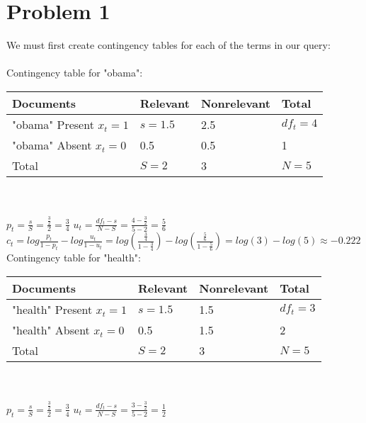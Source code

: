 \documentclass{article}%
\begin{document}
\section*{Problem 1}
We must first create contingency tables for each of the terms in our query:\\
\\
Contingency table for "obama": \\
\begin{tabular}{| l | l | l | l |}
    \hline
    Documents                   &  Relevant     & Nonrelevant   & Total         \\ \hline
    "obama" Present $x_t = 1$   &  $s = 1.5$    & 2.5           & $df_t = 4$    \\ \hline
    "obama" Absent $x_t = 0$    &  0.5          & 0.5           & 1           \\ \hline
    Total                       &  $S = 2$    & 3               & $N = 5$       \\ \hline
\end{tabular}\\
\\
$p_t = \frac{s}{S} = \frac{\frac{3}{2}}{2} = \frac{3}{4}$ \hfill
$u_t = \frac{df_t - s}{N - S} = \frac{4 - \frac{3}{2}}{5 - 2} = \frac{5}{6}$
\vspace{2mm}\\
$c_t = log \frac{p_t}{1- p_t} - log \frac{u_t}{1 - u_t}
= log \left(\frac{\frac{3}{4}}{1 - \frac{3}{4}}\right) - log \left(\frac{\frac{5}{6}}{1 - \frac{5}{6}}\right)
= log(3) - log(5) \approx -0.222$
\vspace{5mm}\\
Contingency table for "health": \\
\begin{tabular}{| l | l | l | l |}
    \hline
    Documents                   &  Relevant     & Nonrelevant   & Total         \\ \hline
    "health" Present $x_t = 1$  &  $s = 1.5$    & 1.5           & $df_t = 3$    \\ \hline
    "health" Absent $x_t = 0$   &  0.5          & 1.5           & 2             \\ \hline
    Total                       &  $S = 2$      & 3             & $N = 5$       \\ \hline
\end{tabular}\\
\\
$p_t = \frac{s}{S} = \frac{\frac{3}{2}}{2} = \frac{3}{4}$ \hfill
$u_t = \frac{df_t - s}{N - S} = \frac{3 - \frac{3}{2}}{5 - 2} = \frac{1}{2}$
\end{document}
